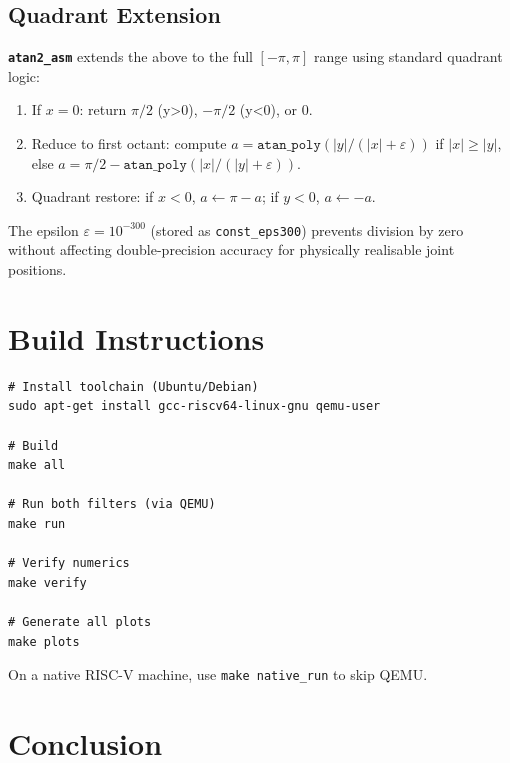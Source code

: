 \documentclass[12pt,a4paper]{article}
\newcommand{\func}[1]{\texttt{\bfseries #1}}
\begin{document}
\subsection{Quadrant Extension}

\func{atan2\_asm} extends the above to the full $[-\pi,\pi]$ range
using standard quadrant logic:

\begin{enumerate}[noitemsep]
  \item If $x=0$: return $\pi/2$ (y>0), $-\pi/2$ (y<0), or 0.
  \item Reduce to first octant: compute $a = \texttt{atan\_poly}(|y|/(|x|+\varepsilon))$
        if $|x| \ge |y|$, else $a = \pi/2 - \texttt{atan\_poly}(|x|/(|y|+\varepsilon))$.
  \item Quadrant restore: if $x<0$, $a \leftarrow \pi - a$; if $y<0$, $a \leftarrow -a$.
\end{enumerate}

The epsilon $\varepsilon = 10^{-300}$ (stored as \texttt{const\_eps300}) prevents
division by zero without affecting double-precision accuracy for
physically realisable joint positions.

\section{Build Instructions}
\label{sec:build}

\begin{mdframed}
\begin{verbatim}
# Install toolchain (Ubuntu/Debian)
sudo apt-get install gcc-riscv64-linux-gnu qemu-user

# Build
make all

# Run both filters (via QEMU)
make run

# Verify numerics
make verify

# Generate all plots
make plots
\end{verbatim}
\end{mdframed}

On a native RISC-V machine, use \texttt{make native\_run} to skip QEMU.

\section{Conclusion}
\end{document}
